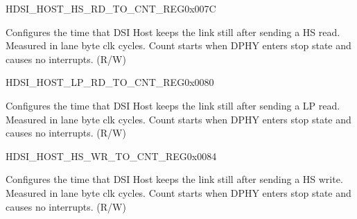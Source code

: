 \begin{register}{H}{DSI\_HOST\_HS\_RD\_TO\_CNT\_REG}{0x007C}\label{regdesc:DSIHOSTHSRDTOCNTREG}
%
%
\regnewline%
\begin{regdesc}\begin{reglist}
\label{fielddesc:DSIHOSTHSRDTOCNT}\item [DSI\_HOST\_HS\_RD\_TO\_CNT] Configures the time that DSI Host keeps the link still after sending a HS read. Measured in lane byte clk cycles. Count starts when DPHY enters stop state and causes no interrupts. (R/W)
\end{reglist}\end{regdesc}
\end{register}


\begin{register}{H}{DSI\_HOST\_LP\_RD\_TO\_CNT\_REG}{0x0080}\label{regdesc:DSIHOSTLPRDTOCNTREG}
%
%
\regnewline%
\begin{regdesc}\begin{reglist}
\label{fielddesc:DSIHOSTLPRDTOCNT}\item [DSI\_HOST\_LP\_RD\_TO\_CNT] Configures the time that DSI Host keeps the link still after sending a LP read. Measured in lane byte clk cycles. Count starts when DPHY enters stop state and causes no interrupts. (R/W)
\end{reglist}\end{regdesc}
\end{register}


\begin{register}{H}{DSI\_HOST\_HS\_WR\_TO\_CNT\_REG}{0x0084}\label{regdesc:DSIHOSTHSWRTOCNTREG}
%
%
\regnewline%
\begin{regdesc}\begin{reglist}
\label{fielddesc:DSIHOSTHSWRTOCNT}\item [DSI\_HOST\_HS\_WR\_TO\_CNT] Configures the time that DSI Host keeps the link still after sending a HS write. Measured in lane byte clk cycles. Count starts when DPHY enters stop state and causes no interrupts. (R/W)
\end{reglist}\end{regdesc}
\end{register}


